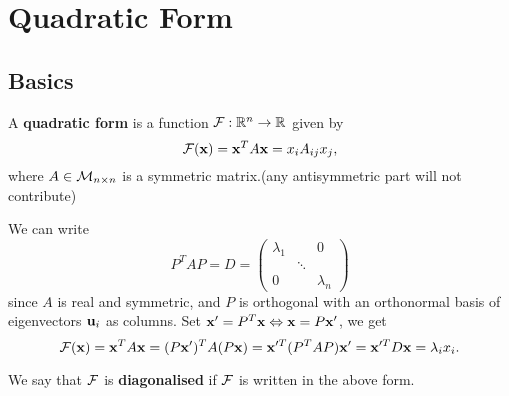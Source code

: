 \documentclass[10pt]{article}
\begin{document}
    \section{Quadratic Form}
    \subsection{Basics}
    \begin{definition}

        A \textbf{quadratic form} is a function ${\mathcal{F}}: \mathbb{R}^{n}\to \mathbb{R}$ given by
        \[
            {\mathcal{F}}({\bf x}) = {\bf x}^TA{\bf x}=x_iA_{ij}x_j,
        \]
        where $A\in {\mathcal{M}}_{n\times n}$ is a symmetric matrix.(any antisymmetric part will not contribute)
    \end{definition}
    We can write 
    \[
        P^TAP=D=\begin{pmatrix}
            \lambda_1&&0\\
            &\ddots&\\
            0&&\lambda_n
        \end{pmatrix}
    \]
    since $A$ is real and symmetric, and $P$ is orthogonal with an orthonormal basis of eigenvectors ${\bf u}_i$ as columns. Set $ {\bf x}'=P^T{\bf x} \Leftrightarrow {\bf x}=P{\bf x}' $, we get 
    \[
        {\mathcal{F}}({\bf x})= {\bf x}^TA{\bf x}=(P{\bf x}')^TA(P{\bf x})={\bf x}'^T(P^TAP){\bf x}'={\bf x}'^TD{\bf x} = \lambda_i x_i.
    \]
    \begin{definition}
        We say that ${\mathcal{F}}$ is \textbf{diagonalised} if ${\mathcal{F}}$ is written in the above form.
    \end{definition}
\end{document}
